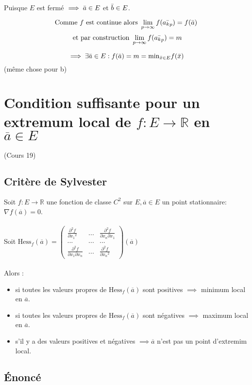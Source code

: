 \documentclass{article}
\begin{document}
Puisque $ E $ est fermé $ \implies \Bar{a} \in E $ et $ \Bar{b} \in E $.

\[ \text{Comme $f$ est continue alors } \lim_{p\to\infty} f(\Bar{{a_k}_p}) = f(\Bar{a}) \]
\[ \text{ et par construction } \lim_{p\to\infty} f(\Bar{{a_k}_p}) = m \]

\[ \implies \exists \Bar{a} \in E : f(\Bar{a}) = m = \text{min}_{\Bar{x}\in E} f(\Bar{x}) \] (même chose pour b)

\newpage

\section{Condition suffisante pour un extremum local de $ f : E \to \mathbb{R}$ en $ \overline{a} \in E $}

(Cours 19)

\subsection{Critère de Sylvester}

Soit $ f : E \to \mathbb{R} $ une fonction de classe $ C^2 $ sur $ E, \overline{a} \in E $ un point stationnaire: $ \nabla{f(\overline{a})} = 0$.\\\\
Soit $ \text{Hess}_f(\overline{a}) = \begin{pmatrix}
\frac{\partial^2{f}}{\partial{x_1}^2} & ... & \frac{\partial^2{f}}{\partial{x_n}\partial{x_1}}\\
... &  ... & ... \\
\frac{\partial^2{f}}{\partial{x_1}\partial{x_n}} & ... & \frac{\partial^2{f}}{\partial{x_n}^2}
\end{pmatrix}(\overline{a})$\\\\
Alors :
\begin{itemize}
    \item si toutes les valeurs propres de $ \text{Hess}_f(\overline{a}) $ sont positives $ \implies $ minimum local en $ \overline{a} $.
    \item si toutes les valeurs propres de $ \text{Hess}_f(\overline{a}) $ sont négatives $ \implies $ maximum local en $ \overline{a} $.
    \item s'il y a des valeurs positives et négatives $ \implies \overline{a} $ n'est pas un point d'extremim local.
\end{itemize}

\subsection{Énoncé}
\end{document}

